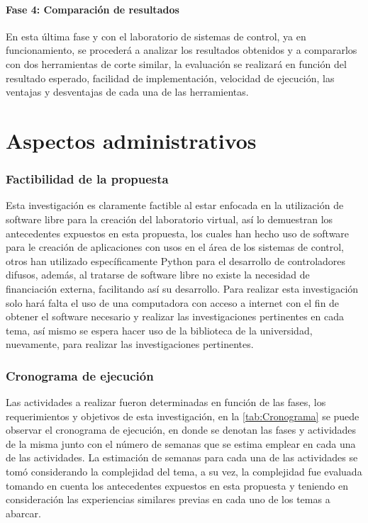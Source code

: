 	\paragraph{Fase 4: Comparación de resultados}
		
		En esta última fase y con el laboratorio de sistemas de control, ya en funcionamiento, se procederá a analizar los resultados obtenidos y a compararlos con dos herramientas de corte similar, la evaluación se realizará en función del resultado esperado, facilidad de implementación, velocidad de ejecución, las ventajas y desventajas de cada una de las herramientas.

\section{Aspectos administrativos}

		\subsubsection{Factibilidad de la propuesta}

		Esta investigación es claramente factible al estar enfocada en la utilización de software libre para la creación del laboratorio virtual, así lo demuestran los antecedentes expuestos en esta propuesta, los cuales han hecho uso de software para le creación de aplicaciones con usos en el área de los sistemas de control, otros han utilizado específicamente Python para el desarrollo de controladores difusos, además, al tratarse de software libre no existe la necesidad de financiación externa, facilitando así su desarrollo. Para realizar esta investigación solo hará falta el uso de una computadora con acceso a internet con el fin de obtener el software necesario y realizar las investigaciones pertinentes en cada tema, así mismo se espera hacer uso de la biblioteca de la universidad, nuevamente, para realizar las investigaciones pertinentes.
		
	\subsubsection{Cronograma de ejecución}

		Las actividades a realizar fueron determinadas en función de las fases, los requerimientos y objetivos de esta investigación, en la \cref{tab:Cronograma} se puede observar el cronograma de ejecución, en donde se denotan las fases y actividades de la misma junto con el número de semanas que se estima emplear en cada una de las actividades. La estimación de semanas para cada una de las actividades se tomó considerando la complejidad del tema, a su vez, la complejidad fue evaluada tomando en cuenta los antecedentes expuestos en esta propuesta y teniendo en consideración las experiencias similares previas en cada uno de los temas a abarcar.

